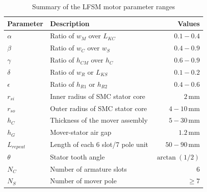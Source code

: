             
            \begin{table}[!ht]
                \renewcommand{\arraystretch}{1.2}
                \caption{Summary of the \acs{LFSM} motor parameter ranges}
                \label{table:chap/rsm/LFSM/design range}
                \centering
                \begin{tabular}{@{}llr@{}}
                \hline
                \bfseries Parameter & \bfseries Description & \bfseries Values\\
                \hline
                    $\alpha$	    & Ratio of $w_M$ over $L_{KC}$              &	$0.1-0.4$\\ 
                    $\beta$	        & Ratio of $w_C$ over $w_S$		            &	$0.4-0.9$\\ 
                    $\gamma$	    & Ratio of $h_{CM}$ over $h_C$			    &	$0.6-0.9$\\ 
                    $\delta$	    & Ratio of $w_R$ or $L_{KS}$		        &	$0.1-0.2$\\ 
                    $\epsilon$	    & Ratio of $h_{R1}$ or $h_{R2}$		        &	$0.4-0.6$\\ 
                    $r_{si}$	    & Inner radius of SMC stator core 	        &	$2\,\mathrm{mm}$\\ 
                    $r_{so}$	    & Outer radius of SMC stator core 			&	$4-10\,\mathrm{mm}$\\ 
                    $h_C$           & Thickness of the mover assembly           &	$5-30\,\mathrm{mm}$\\ 
                    $h_G$	        & Mover-stator air gap 					    &	$1.2\,\mathrm{mm}$\\ 
                    $L_{repeat}$	& Length of each 6 slot/7 pole unit 		&	$50-90\,\mathrm{mm}$\\ 
                    $\theta$	    & Stator tooth angle 		                &	$\arctan(1/2)$\\ 
                    $N_C$	        & Number of armature slots 		            &	    $6$\\ 
                    $N_S$	        & Number of mover pole 		                &	$\geq 7$\\ 
                \hline
                \end{tabular}
            \end{table}
            
